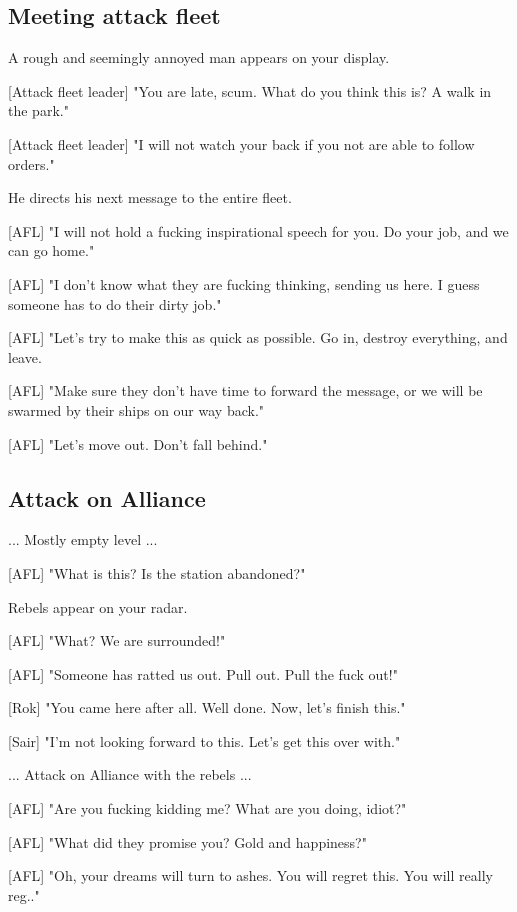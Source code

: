 \documentclass[a4paper,12pt]{article}
\begin{document}
\subsection{Meeting attack fleet}

A rough and seemingly annoyed man appears on your display.

[Attack fleet leader] "You are late, scum. What do you think this is? A walk in the park."

[Attack fleet leader] "I will not watch your back if you not are able to follow orders."

He directs his next message to the entire fleet.

[AFL] "I will not hold a fucking inspirational speech for you. Do your job,
and we can go home." 

[AFL] "I don't know what they are fucking thinking, sending us here. I guess someone has to do their dirty job."

[AFL] "Let's try to make this as quick as possible. Go in, destroy everything,
and leave.

[AFL] "Make sure they don't have time to forward the message, or we will be swarmed by their ships on our way back."

[AFL] "Let's move out. Don't fall behind."

\subsection{Attack on Alliance}

... Mostly empty level ...

[AFL] "What is this? Is the station abandoned?"

Rebels appear on your radar.

[AFL] "What? We are surrounded!" 

[AFL] "Someone has ratted us out. Pull out. Pull the fuck out!"

[Rok] "You came here after all. Well done. Now, let's finish this."

[Sair] "I'm not looking forward to this. Let's get this over with."

... Attack on Alliance with the rebels ...

[AFL] "Are you fucking kidding me? What are you doing, idiot?"

[AFL] "What did they promise you? Gold and happiness?" 

[AFL] "Oh, your dreams will turn to ashes. You will regret this. You will really reg.."
\end{document}
